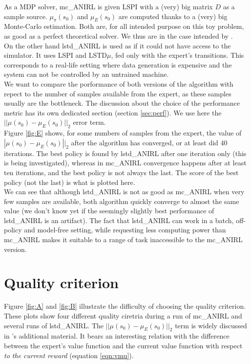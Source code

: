 \documentclass{article}
\begin{document}
As a MDP solver, mc\_ANIRL is given LSPI with a (very) big matrix $D$ as a sample source. $\mu_\pi(s_0)$ and $\mu_E(s_0)$ are computed thanks to a (very) big Monte-Carlo estimation. Both are, for all intended purpose on this toy problem, as good as a perfect theoretical solver. We thus are in the case intended by \citet{abbeel2004apprenticeship}.\\

On the other hand lstd\_ANIRL is used as if it could not have access to the simulator. It uses LSPI and LSTD$\mu$, fed only with the expert's transitions. This corresponds to a real-life setting where data generation is expensive and the system can not be controlled by an untrained machine.\\

We want to compare the porformance of both versions of the algorithm with repect to the number of samples available from the expert, as these samples usually are the bottleneck. The discussion about the choice of the performance metric has its own dedicated section (section \ref{sec:perf}). We use here the $||\mu(s_0) - \mu_E(s_0)||_2$ error term.\\

Figure \ref{fig:E} shows, for some numbers of samples from the expert, the value of $|\mu(s_0)-\mu_E(s_0)||_2$ after the algorithm has converged, or at least did 40 iterations. The best policy is found by lstd\_ANIRL after one iteration only (this is being investigated), whereas in mc\_ANIRL convergence happens after at least ten iterations, and the best policy is not always the last. The score of the best policy (not the last) is what is plotted here.\\

We can see that although lstd\_ANIRL is not as good as mc\_ANIRL when very few samples are available, both algorithm quickly converge to almost the same value (we don't know yet if the seemingly slightly best performance of lstd\_ANIRL is an artifact). The fact that lstd\_ANIRL can work in a batch, off-policy and model-free setting, while requesting less computing power than mc\_ANIRL makes it suitable to a range of task inaccessible to the mc\_ANIRL version.
\section{Quality criterion}

Figure \ref{fig:A} and \ref{fig:B} illustrate the difficulty of choosing the quality criterion. These plots show four different quality ciretria during a run of mc\_ANIRL and several runs of lstd\_ANIRL. The $||\mu(s_0) - \mu_E(s_0)||_2$ term is widely discussed in \citep{abbeel2004apprenticeship}'s additional material. It bears an interesting relation with the difference between the expert's value function and the current value function with respect \emph{to the current reward} (equation \ref{eqn:vmu}).\\
\end{document}
